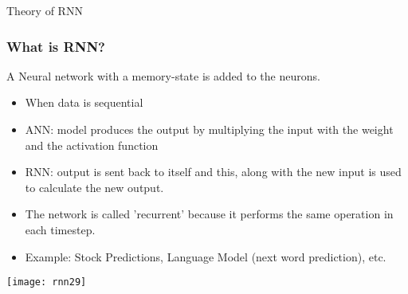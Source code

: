 


\begin{frame}
  \begin{center}
    {\Large Theory of RNN}
  \end{center}
\end{frame}

\begin{frame}[fragile] \frametitle{What is RNN?}
A Neural network with a memory-state is added to the neurons. 
\begin{itemize}
\item When data is sequential
\item ANN: model produces the output by multiplying the input with the weight and the activation function
\item RNN: output is sent back to itself and this, along with the new input is used to calculate the new output.
\item The network is called 'recurrent' because it performs the same operation in each timestep.
\item Example: Stock Predictions, Language Model (next word prediction), etc.
\end{itemize}


\begin{center}
\texttt{[image: rnn29]}
\end{center}
\end{frame}


